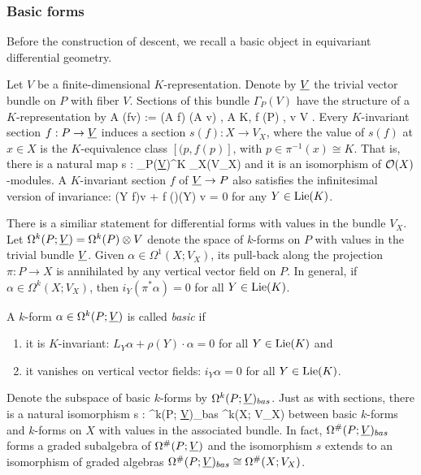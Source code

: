 \documentclass[10pt]{amsart}
\begin{document}
\subsubsection{Basic forms}

Before the construction of descent, we recall a basic object in equivariant differential geometry.

Let $V$ be a finite-dimensional $K$-representation. 
Denote by $\underline{V}$ the trivial vector bundle on $P$ with fiber $V$. 
Sections of this bundle $\Gamma_P(V)$ have the structure of a $K$-representation by
\ben
A \cdot (f\tensor v) := (A \cdot f) \tensor (A \cdot v) \;\; , \;\; A \in K, \; f \in \cO(P)\; , v \in V .
\een
Every $K$-invariant section $f : P \to \underline{V}$ induces a section $s(f): X \to V_X$,
where the value of $s(f)$ at $x \in X$ is the $K$-equivalence class $[(p,f(p)]$, with $p \in \pi^{-1}(x) \cong K$.
That is, there is a natural map 
\ben
s : \Gamma_P(\ul{V})^K \to \Gamma_X(V_X) 
\een
and it is an isomorphism of $\mathcal O(X)$-modules. A $K$-invariant section $f$ of $\underline{V} \to P$ also satisfies the infinitesimal version of invariance: 
\ben
(Y \cdot f)\tensor v + f (\rho)(Y) \cdot v = 0 
\een
for any $Y \in {\rm Lie}(K)$.

There is a similiar statement for differential forms with values in the bundle $V_X$. Let $\Omega^k(P ; \underline{V}) = \Omega^k(P) \otimes V$ denote the space of $k$-forms on $P$ with values in the trivial bundle $\underline{V}$. Given $\alpha \in \Omega^1(X ; V_X)$, its pull-back along the projection $\pi: P \to X$ is annihilated by any vertical vector field on $P$. In general, if $\alpha \in \Omega^k(X; V_X)$, then $i_Y(\pi^*\alpha) = 0$ for all $Y \in {\rm Lie}(K)$.

\begin{dfn} A $k$-form $\alpha \in \Omega^k(P; \underline{V})$ is called {\em basic} if 
\begin{enumerate}
\item it is $K$-invariant: $L_Y \alpha + \rho(Y) \cdot \alpha = 0 $ for all $Y \in {\rm Lie}(K)$ and
\item  it vanishes on vertical vector fields: $i_Y \alpha = 0$ for all $Y \in {\rm Lie}(K)$. 
\end{enumerate}
\end{dfn}

Denote the subspace of basic $k$-forms by $\Omega^k(P; \underline{V})_{bas}$. Just as with sections, there is a natural isomorphism
\ben
s : \Omega^k(P; \ul{V})_{bas} \xto{\cong} \Omega^k(X; V_X) 
\een
between basic $k$-forms and $k$-forms on $X$ with values in the associated bundle.
In fact, $\Omega^{\#}(P; \underline{V})_{bas}$ forms a graded subalgebra of $\Omega^{\#}(P; \underline{V})$ and the isomorphism $s$ extends to an isomorphism of graded algebras $\Omega^{\#}(P; \underline{V})_{bas} \cong \Omega^{\#}(X; V_X)$.
\end{document}
